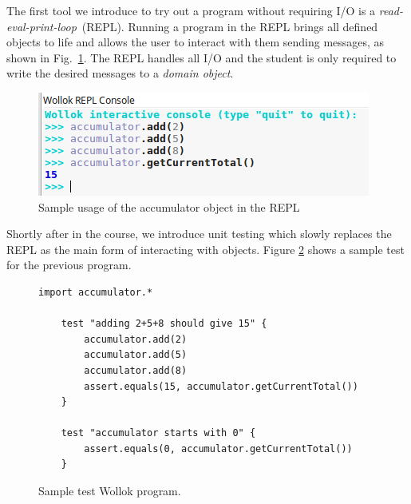 The first tool we introduce to try out a program without requiring I/O is a \emph {read-eval-print-loop}~(REPL). Running a program in the REPL brings all defined objects to life and allows the user to interact with them sending messages, as shown in Fig.~\ref{fig:repl}. 
The REPL handles all I/O and the student is only required to write the desired messages to a \emph{domain object}.

\begin{figure}[ht]
 \centering
 \includegraphics[scale=0.6]{../images/accumulator-repl.png}
 \caption{\small Sample usage of the accumulator object in the REPL}
 \label{fig:repl}
\end{figure}




Shortly after in the course, we introduce unit testing which slowly replaces the REPL as the main form of interacting with objects. Figure \ref{fig:test} shows a sample test for the previous program. 

\begin{figure}[ht]
 \centering
 \begin{lstlisting}[language=Wollok]
 	import accumulator.*

	test "adding 2+5+8 should give 15" {
		accumulator.add(2)
		accumulator.add(5)
		accumulator.add(8)
		assert.equals(15, accumulator.getCurrentTotal())		
	}
   
	test "accumulator starts with 0" {
		assert.equals(0, accumulator.getCurrentTotal())
	}\end{lstlisting}
\vspace{-3mm}
\caption{\small Sample test Wollok program.}
\vspace{-5mm}
\label{fig:test}
\end{figure}

